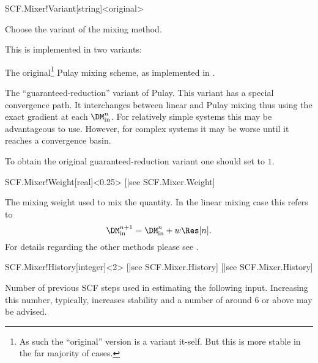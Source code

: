\begin{fdfentry}{SCF.Mixer!Variant}[string]<original>

  Choose the variant of the mixing method.

  \begin{fdfoptions}

    \option[Pulay] %
    This is implemented in two variants:
    \begin{fdfoptions}

      The original\footnote{As such the ``original'' version is a
          variant it-self. But this is more stable in the far majority
          of cases.} Pulay mixing scheme, as implemented in
      \citet{Kresse1996}.
      
      \option[GR] %
      The ``guaranteed-reduction'' variant of
      Pulay\cite{Bowler2000}. This variant has a special convergence
      path. It interchanges between linear and Pulay mixing thus using
      the exact gradient at each $\DM^n_{\mathrm{in}}$.  For
      relatively simple systems this may be advantageous to
      use. However, for complex systems it may be worse until it
      reaches a convergence basin.

      To obtain the original guaranteed-reduction variant one should
      set  to $1$.

    \end{fdfoptions}

  \end{fdfoptions}

\end{fdfentry}

\begin{fdfentry}{SCF.Mixer!Weight}[real]<0.25>%
  [|see SCF.Mixer.Weight]

  The mixing weight used to mix the quantity.
  In the linear mixing case this refers to
  \begin{equation}
    \DM^{n+1}_{\mathrm{in}} = \DM^n_{\mathrm{in}} + w \Res[n].
  \end{equation}
  For details regarding the other methods please see .

\end{fdfentry}


\begin{fdfentry}{SCF.Mixer!History}[integer]<2>%
  [|see SCF.Mixer.History]%
  [|see SCF.Mixer.History]

  Number of previous SCF steps used in estimating the following input.
  Increasing this number, typically, increases stability and a number
  of around 6 or above may be advised.
  
\end{fdfentry}


